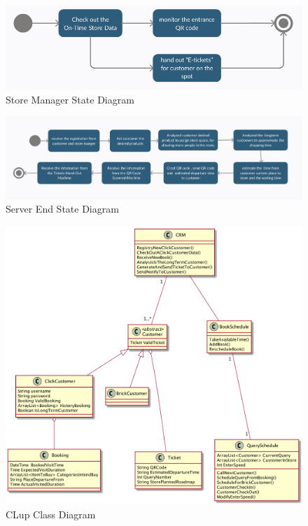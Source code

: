 \documentclass[a4paper,12pt]{book}
\begin{document}
\begin{figure} \label{State Diagram}
	\includegraphics[scale=0.3]{State_diagram2.png}
	\caption{Store Manager State Diagram}
	\centering
\end{figure}

\begin{figure} \label{State Diagram}
	\includegraphics[scale=0.3]{State_diagram3.png}
	\caption{Server End State Diagram}
	\centering
\end{figure}


\begin{figure} \label{Class Diagram}
	\includegraphics[scale=0.3]{class_diagram.png}
	\caption{CLup Class Diagram}
	\centering
\end{figure}
\end{document}
